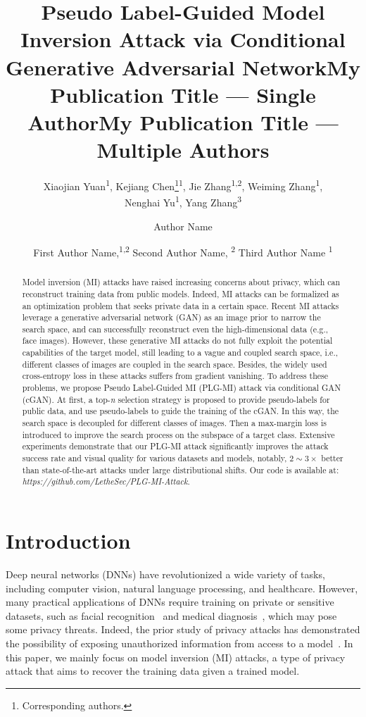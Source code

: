 \documentclass[letterpaper]{article} %
\title{Pseudo Label-Guided Model Inversion Attack via Conditional Generative Adversarial Network}
\author{
    Xiaojian Yuan\textsuperscript{\rm 1},
    Kejiang Chen\footnote{Corresponding authors.}\textsuperscript{\rm 1},
    Jie Zhang\textsuperscript{\rm 1,2},
    Weiming Zhang\textsuperscript{\rm 1}, \\
    Nenghai Yu\textsuperscript{\rm 1},
    Yang Zhang\textsuperscript{\rm 3}
}
\title{My Publication Title --- Single Author}
\author {
    Author Name
}
\title{My Publication Title --- Multiple Authors}
\author {
    First Author Name,\textsuperscript{\rm 1,\rm 2}
    Second Author Name, \textsuperscript{\rm 2}
    Third Author Name \textsuperscript{\rm 1}
}
\begin{document}
\maketitle

\begin{abstract}
Model inversion (MI) attacks have raised increasing concerns about privacy, which can reconstruct training data from public models. Indeed, MI attacks can be formalized as an optimization problem that seeks private data in a certain space. Recent MI attacks leverage a generative adversarial network (GAN) as an image prior to narrow the search space, and can successfully reconstruct even the high-dimensional data (e.g., face images). However, these generative MI attacks do not fully exploit the potential capabilities of the target model, still leading to a vague and coupled search space, i.e., different classes of images are coupled in the search space. Besides, the widely used cross-entropy loss in these attacks suffers from gradient vanishing. To address these problems, we propose Pseudo Label-Guided MI (PLG-MI) attack via conditional GAN (cGAN). At first, a top-\emph{n} selection strategy is proposed to provide pseudo-labels for public data, and use pseudo-labels to guide the training of the cGAN. In this way, the search space is decoupled for different classes of images. Then a max-margin loss is introduced to improve the search process on the subspace of a target class. Extensive experiments demonstrate that our PLG-MI attack significantly improves the attack success rate and visual quality for various datasets and models, notably, $2\sim3 \times$ better than state-of-the-art attacks under large distributional shifts.
Our code is available at: \textit{https://github.com/LetheSec/PLG-MI-Attack}.
\end{abstract}



\section{Introduction}\label{sec:intro}

Deep neural networks (DNNs) have revolutionized a wide variety of tasks, including computer vision, natural language processing, and healthcare. However, many practical applications of DNNs require training on private or sensitive datasets, such as facial recognition~\cite{taigman2014deepface} and medical diagnosis~\cite{rajpurkar2017chexnet}, which may pose some privacy threats. 
Indeed, the prior study of privacy attacks has demonstrated the possibility of exposing unauthorized information from access to a model~\cite{shokri2017membership, gopinath2019property, tramer2016stealing, fredrikson2015model}. 
In this paper, we mainly focus on model inversion (MI) attacks, a type of privacy attack that aims to recover the training data given a trained model. 
        
\end{document}
